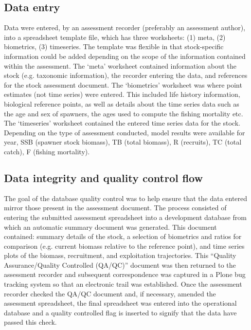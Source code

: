 \documentclass[letterpaper,12pt]{article}
\begin{document}
\subsection{Data entry}
Data were entered, by an assessment recorder (preferably an assessment
author), into a spreadsheet template file, which has three worksheets:
(1) meta, (2) biometrics, (3) timeseries. The template was flexible in
that stock-specific information could be added depending on the scope
of the information contained within the assessment.  The `meta'
worksheet contained information about the stock (e.g. taxonomic
information), the recorder entering the data, and references for the
stock assessment document. The `biometrics' worksheet was where point
estimates (not time series) were entered.  This included life history
information, biological reference points, as well as details about the
time series data such as the age and sex of spawners, the ages used to
compute the fishing mortality etc.  The `timeseries' worksheet
contained the entered time series data for the stock. Depending on the
type of assessment conducted, model results were available for year,
SSB (spawner stock biomass), TB (total biomass), R (recruits), TC
(total catch), F (fishing mortality).




\subsection{Data integrity and quality control flow}
The goal of the database quality control was to help ensure that the data entered
mirror those present in the assessment document. The process consisted
of entering the submitted assessment spreadsheet into a development
database from which an automatic summary document was generated. This document contained: summary details of the stock,
a selection of biometrics and ratios for comparison (e.g. current
biomass relative to the reference point), and time series plots of the
biomass, recruitment, and exploitation trajectories. This ``Quality
Assurance/Quality Controlled (QA/QC)'' document was then returned to
the assessment recorder and subsequent correspondence was captured in a
Plone bug tracking system so that an electronic trail was established.
Once the assessment recorder checked the QA/QC document and, if
necessary, amended the assessment spreadsheet, the final spreadsheet
was entered into the operational database and a quality controlled
flag is inserted to signify that the data have passed this check.
 
\end{document}
